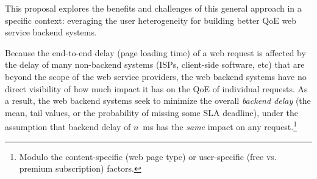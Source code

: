 This proposal explores the benefits and challenges of this general approach in a specific context: everaging the user heterogeneity for building better QoE web service backend systems.

Because the end-to-end delay (page loading time) of a web request is affected by the delay of many non-backend systems (ISPs, client-side software, etc) that are beyond the scope of the web service providers, the web backend systems have no direct visibility of how much impact it has on the QoE of individual requests.
As a result, the web backend systems seek to minimize the overall {\em backend delay} (\eg the mean, tail values, or the probability of missing some SLA deadline), under the assumption that backend delay of $n$~ms has the {\em same} impact on any request.\footnote{Modulo the content-specific (\eg web page type) or user-specific (\eg free vs. premium subscription) factors.}

